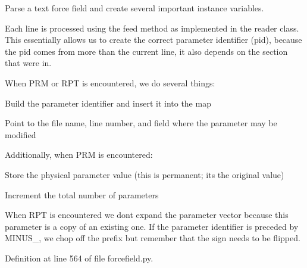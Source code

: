 Parse a text force field and create several important instance variables. 

Each line is processed using the \textquotesingle{}feed\textquotesingle{} method as implemented in the reader class. This essentially allows us to create the correct parameter identifier (pid), because the pid comes from more than the current line, it also depends on the section that we\textquotesingle{}re in.

When \textquotesingle{}P\+RM\textquotesingle{} or \textquotesingle{}R\+PT\textquotesingle{} is encountered, we do several things\+:
\begin{DoxyItemize}
\item Build the parameter identifier and insert it into the map
\item Point to the file name, line number, and field where the parameter may be modified
\end{DoxyItemize}

Additionally, when \textquotesingle{}P\+RM\textquotesingle{} is encountered\+:
\begin{DoxyItemize}
\item Store the physical parameter value (this is permanent; it\textquotesingle{}s the original value)
\item Increment the total number of parameters
\end{DoxyItemize}

When \textquotesingle{}R\+PT\textquotesingle{} is encountered we don\textquotesingle{}t expand the parameter vector because this parameter is a copy of an existing one. If the parameter identifier is preceded by M\+I\+N\+U\+S\+\_\+, we chop off the prefix but remember that the sign needs to be flipped. 

Definition at line 564 of file forcefield.\+py.

